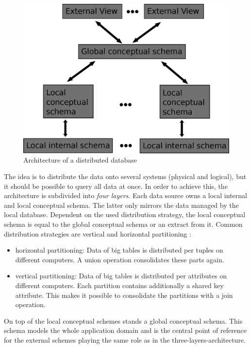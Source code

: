 \begin{figure}[H]
	\begin{center}
		\includegraphics[scale=0.5]{figures/distributedDatabaseArchitecture.png}
	\end{center}
	\caption{Architecture of a distributed database \cite[p. 92]{DBLP:books/dp/LeserN2006}}
	\label{DistributedDatabaseArchitecture}
\end{figure}


The idea is to distribute the data onto several systems (physical and logical), but it should be possible to query all data at once. In order to achieve this, the architecture is subdivided into \textit{four layers}. Each data source owns a local internal and local conceptual schema. The latter only mirrors the data managed by the local database. Dependent on the used distribution strategy, the local conceptual schema is equal to the global conceptual schema  or an extract from it. Common distribution strategies are vertical and horizontal partitioning \cite[p. 92]{DBLP:books/dp/LeserN2006}: 
\begin{itemize}
\item horizontal partitioning: Data of big tables is distributed per tuples on different computers. A union operation consolidates these parts again.
\item vertical partitioning: Data of big tables is distributed per attributes on different computers. Each partition contains additionally a shared key attribute. This makes it possible to consolidate the partitions with a join operation.
\end{itemize}
On top of the local conceptual schemes stands a global conceptual schema. This schema models the whole application domain and is the central point of reference for the external schemes playing the same role as in the three-layers-architecture.

